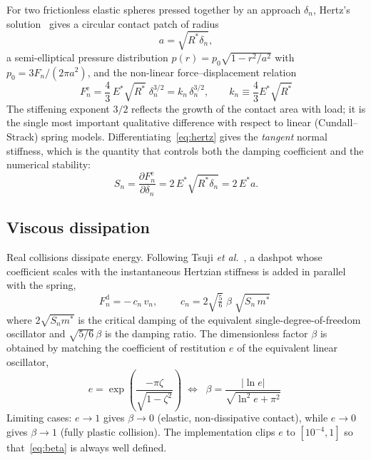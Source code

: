 For two frictionless elastic spheres pressed together by an approach
$\delta_{n}$, Hertz's solution~\cite{hertz1882,johnson1985} gives a circular
contact patch of radius
\begin{equation}
  a = \sqrt{R^{*}\delta_{n}},
  \label{eq:contact-radius}
\end{equation}
a semi-elliptical pressure distribution
$p(r)=p_{0}\sqrt{1-r^{2}/a^{2}}$ with $p_{0}=3F_{n}/(2\pi a^{2})$, and the
non-linear force--displacement relation
\begin{equation}
  \boxed{\;
  F_{n}^{\mathrm{e}}
  = \frac{4}{3}\,E^{*}\sqrt{R^{*}}\;\delta_{n}^{3/2}
  = k_{n}\,\delta_{n}^{3/2},
  \qquad
  k_{n} \equiv \frac{4}{3}E^{*}\sqrt{R^{*}} \;}
  \label{eq:hertz}
\end{equation}
The stiffening exponent $3/2$ reflects the growth of the contact area with
load; it is the single most important qualitative difference with respect to
linear (Cundall--Strack) spring models.  Differentiating~\eqref{eq:hertz} gives
the \emph{tangent} normal stiffness, which is the quantity that controls both the
damping coefficient and the numerical stability:
\begin{equation}
  S_{n} = \frac{\partial F_{n}^{\mathrm{e}}}{\partial \delta_{n}}
        = 2\,E^{*}\sqrt{R^{*}\delta_{n}}
        = 2\,E^{*}a .
  \label{eq:Sn}
\end{equation}

\subsection{Viscous dissipation}
\label{sec:normal-damping}

Real collisions dissipate energy.  Following Tsuji \emph{et
al.}~\cite{tsuji1992}, a dashpot whose coefficient scales with the instantaneous
Hertzian stiffness is added in parallel with the spring,
\begin{equation}
  F_{n}^{\mathrm{d}} = -\,c_{n}\,v_{n},
  \qquad
  \boxed{\;c_{n} = 2\sqrt{\tfrac{5}{6}}\;\beta\;\sqrt{S_{n}\,m^{*}}\;}
  \label{eq:cn}
\end{equation}
where $2\sqrt{S_{n}m^{*}}$ is the critical damping of the equivalent
single-degree-of-freedom oscillator and $\sqrt{5/6}\,\beta$ is the damping
ratio.  The dimensionless factor $\beta$ is obtained by matching the
coefficient of restitution $e$ of the equivalent linear oscillator,
\begin{equation}
  e = \exp\!\left(\frac{-\pi\zeta}{\sqrt{1-\zeta^{2}}}\right)
  \;\Longleftrightarrow\;
  \boxed{\;
  \beta = \frac{\lvert \ln e\rvert}{\sqrt{\ln^{2}e+\pi^{2}}}\;}
  \label{eq:beta}
\end{equation}
Limiting cases: $e\to1$ gives $\beta\to0$ (elastic, non-dissipative contact),
while $e\to0$ gives $\beta\to1$ (fully plastic collision).  The implementation
clips $e$ to $[10^{-4},1]$ so that~\eqref{eq:beta} is always well defined.

